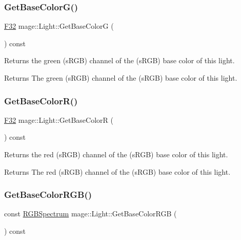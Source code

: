 \subsubsection{\texorpdfstring{Get\+Base\+Color\+G()}{GetBaseColorG()}}
{\footnotesize\ttfamily \hyperlink{namespacemage_aa97e833b45f06d60a0a9c4fc22ae02c0}{F32} mage\+::\+Light\+::\+Get\+Base\+ColorG (\begin{DoxyParamCaption}{ }\end{DoxyParamCaption}) const\hspace{0.3cm}{\ttfamily [noexcept]}}

Returns the green (s\+R\+GB) channel of the (s\+R\+GB) base color of this light.

\begin{DoxyReturn}{Returns}
The green (s\+R\+GB) channel of the (s\+R\+GB) base color of this light. 
\end{DoxyReturn}
\hypertarget{classmage_1_1_light_a8a1db27a646cdae15f42756ab7cea68d}{}\label{classmage_1_1_light_a8a1db27a646cdae15f42756ab7cea68d} 
\subsubsection{\texorpdfstring{Get\+Base\+Color\+R()}{GetBaseColorR()}}
{\footnotesize\ttfamily \hyperlink{namespacemage_aa97e833b45f06d60a0a9c4fc22ae02c0}{F32} mage\+::\+Light\+::\+Get\+Base\+ColorR (\begin{DoxyParamCaption}{ }\end{DoxyParamCaption}) const\hspace{0.3cm}{\ttfamily [noexcept]}}

Returns the red (s\+R\+GB) channel of the (s\+R\+GB) base color of this light.

\begin{DoxyReturn}{Returns}
The red (s\+R\+GB) channel of the (s\+R\+GB) base color of this light. 
\end{DoxyReturn}
\hypertarget{classmage_1_1_light_a37f81e786a9831ed9da0e64bd0261465}{}\label{classmage_1_1_light_a37f81e786a9831ed9da0e64bd0261465} 
\subsubsection{\texorpdfstring{Get\+Base\+Color\+R\+G\+B()}{GetBaseColorRGB()}}
{\footnotesize\ttfamily const \hyperlink{structmage_1_1_r_g_b_spectrum}{R\+G\+B\+Spectrum} mage\+::\+Light\+::\+Get\+Base\+Color\+R\+GB (\begin{DoxyParamCaption}{ }\end{DoxyParamCaption}) const\hspace{0.3cm}{\ttfamily [noexcept]}}

